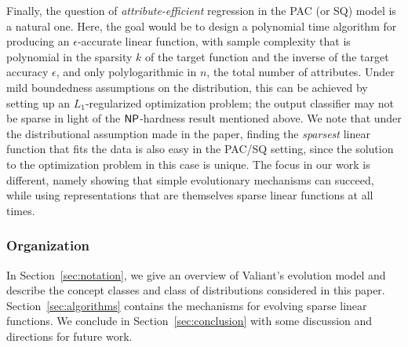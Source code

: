 Finally, the question of \emph{attribute-efficient} regression in the PAC (or
SQ) model is a natural one. Here, the goal would be to design a polynomial time
algorithm for producing an $\epsilon$-accurate linear function, with sample
complexity that is polynomial in the sparsity $k$ of the target function and the
inverse of the target accuracy $\epsilon$, and only polylogarithmic in $n$, the
total number of attributes. Under mild boundedness assumptions on the
distribution, this can be achieved by setting up an $L_1$-regularized
optimization problem; the output classifier may not be sparse in light of the
$\mathsf{NP}$-hardness result mentioned above. We note that under the distributional
assumption made in the paper, finding the \emph{sparsest} linear function that
fits the data is also easy in the PAC/SQ setting, since the solution to the
optimization problem in this case is unique. The focus in our work is different,
namely showing that simple evolutionary mechanisms can succeed, while using
representations that are themselves sparse linear functions at all times.

\subsubsection*{Organization}

In Section~\ref{sec:notation}, we give an overview of Valiant's evolution model
and describe the concept classes and class of distributions considered in this
paper.  Section~\ref{sec:algorithms} contains the mechanisms for evolving sparse
linear functions. We conclude in Section~\ref{sec:conclusion} with some
discussion and directions for future work.
